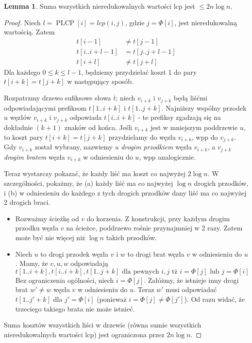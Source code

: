 \documentclass[a4paper,12pt]{article}
\theoremstyle{definition}
\newtheorem{lemma}{Lemma}[section]
\DeclareMathOperator{\PLCP}{PLCP}
\begin{document}
\begin{lemma}
Suma wszystkich nieredukowalnych wartości lcp jest $\le 2n\log n$.
\begin{proof}
Niech $l = \PLCP[i] = lcp(i, j)$, gdzie $j = \Phi[i]$, jest nieredukowalną wartością. Zatem
\begin{align*}
t[i - 1] &\neq t[j - 1] \\
t[i..i+l-1] &= t[j..j+l-1] \\
t[i + l] &\neq t[j + l]
\end{align*}
Dla każdego $0 \le k \le l-1$, będziemy przydzielać koszt 1 do pary $t[i + k] = t[j + k]$ w następujący sposób.
\par
Rozpatrzmy drzewo sufiksowe słowa $\overline{t}$; niech $v_{i+k}$ i $v_{j+k}$ będą liśćmi odpowiadającymi prefiksom $t[1..i+k]$ i $t[1..j+k]$. Najniższy wspólny przodek $u$ węzłów $v_{i+k}$ i $v_{j+k}$ odpowiada $t[i..i+k]$ - te prefiksy zgadzają się na dokładnie $(k+1)$ znaków od końca. Jeśli $v_{i+k}$ jest w mniejszym poddrzewie $u$, to koszt pary $t[i + k] = t[j + k]$ przydzielamy do węzła $v_{i+k}$, wpp do $v_{j+k}$. Gdy $v_{i+k}$ został wybrany, nazwiemy $u$ \textit{drogim przodkiem} węzła $v_{i+k}$, a $v_{j+k}$ \textit{drogim bratem} węzła $v_{i+k}$ w odniesieniu do $u$, wpp analogicznie.
\par
Teraz wystarczy pokazać, że każdy liść ma koszt co najwyżej $2\log n$. W szczególności, pokażmy, że (a) każdy liść ma co najwyżej $\log n$ drogich przodków, i (b) w odniesieniu do każdego z tych drogich przodków dany liść ma co najwyżej 2 drogich braci.
\begin{itemize}
\item Rozważmy ścieżkę od $v$ do korzenia. Z konstrukcji, przy każdym drogim przodku węzła $v$ na ścieżce, poddrzewo rośnie przynajmniej w 2 razy. Zatem może być nie więcej niż $\log n$ takich przodków.
\item Niech $u$ to drogi przodek węzła $v$ i $w$ to drogi brat węzła $v$ w odniesieniu do $u$. Mamy, że $v,u,w$ odpowiadają
\[
t[1..i+k], t[i..i+k],t[1..j+k] \text{ dla pewnych $i, j$ tż  $i = \Phi[j]$ lub $j = \Phi[i]$}
\]
Bez ograniczenia ogólności, niech $i = \Phi[j]$. Załóżmy, że istnieje inny drogi brat $w' \neq w$ węzła $v$ w odniesieniu do $u$. Teraz $w'$ musi odpowiadać $t[1..j'+k]$ dla $j' = \Phi[i]$ (ponieważ $i = \Phi[j] \neq \Phi[j']$). Od razu widać, że trzeciego takiego brata nie może istnieć.
\end{itemize}
Suma kosztów wszystkich liści w drzewie (równa sumie wszystkich nieredukowalnych wartości lcp) jest ograniczona przez $2n\log n$.
\end{proof}
\end{lemma}
\end{document}
